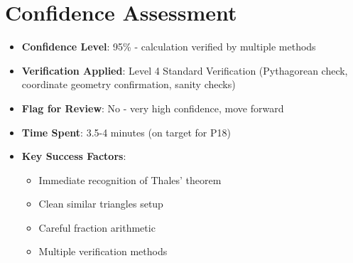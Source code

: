 \documentclass[]{article}
\begin{document}
\section*{Confidence Assessment}
\begin{itemize}[leftmargin=*]
    \item \textbf{Confidence Level}: 95\% - calculation verified by multiple methods
    \item \textbf{Verification Applied}: Level 4 Standard Verification (Pythagorean check, coordinate geometry confirmation, sanity checks)
    \item \textbf{Flag for Review}: No - very high confidence, move forward
    \item \textbf{Time Spent}: 3.5-4 minutes (on target for P18)
    \item \textbf{Key Success Factors}: 
    \begin{itemize}
        \item Immediate recognition of Thales' theorem
        \item Clean similar triangles setup
        \item Careful fraction arithmetic
        \item Multiple verification methods
    \end{itemize}
\end{itemize}
\end{document}
